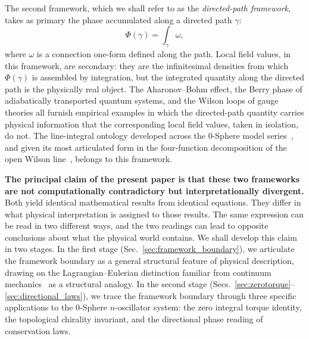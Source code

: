 \documentclass[%
 reprint, amsmath,amssymb, aps, prb, ]{revtex4-2}
\numberwithin{equation}{section}
\begin{document}
The second framework, which we shall refer to as the \emph{directed-path framework}, takes as primary the phase accumulated along a directed path $\gamma$:
\begin{equation}
\Phi(\gamma) = \int_\gamma \omega,
\label{eq:path_integral_primary}
\end{equation}
where $\omega$ is a connection one-form defined along the path. Local field values, in this framework, are secondary: they are the infinitesimal densities from which $\Phi(\gamma)$ is assembled by integration, but the integrated quantity along the directed path is the physically real object. The Aharonov--Bohm effect, the Berry phase of adiabatically transported quantum systems, and the Wilson loops of gauge theories all furnish empirical examples in which the directed-path quantity carries physical information that the corresponding local field values, taken in isolation, do not. The line-integral ontology developed across the 0-Sphere model series~\cite{hanamura31, hanamura29, hanamura30}, and given its most articulated form in the four-function decomposition of the open Wilson line~\cite{hanamura55}, belongs to this framework.

\textbf{The principal claim of the present paper is that these two frameworks are not computationally contradictory but interpretationally divergent.} Both yield identical mathematical results from identical equations. They differ in what physical interpretation is assigned to those results. The same expression can be read in two different ways, and the two readings can lead to opposite conclusions about what the physical world contains. We shall develop this claim in two stages. In the first stage (Sec.~\ref{sec:framework_boundary}), we articulate the framework boundary as a general structural feature of physical description, drawing on the Lagrangian--Eulerian distinction familiar from continuum mechanics~\cite{hanamura55} as a structural analogy. In the second stage (Secs.~\ref{sec:zerotorque}--\ref{sec:directional_laws}), we trace the framework boundary through three specific applications to the 0-Sphere $n$-oscillator system: the zero integral torque identity, the topological chirality invariant, and the directional phase reading of conservation laws.
\end{document}
